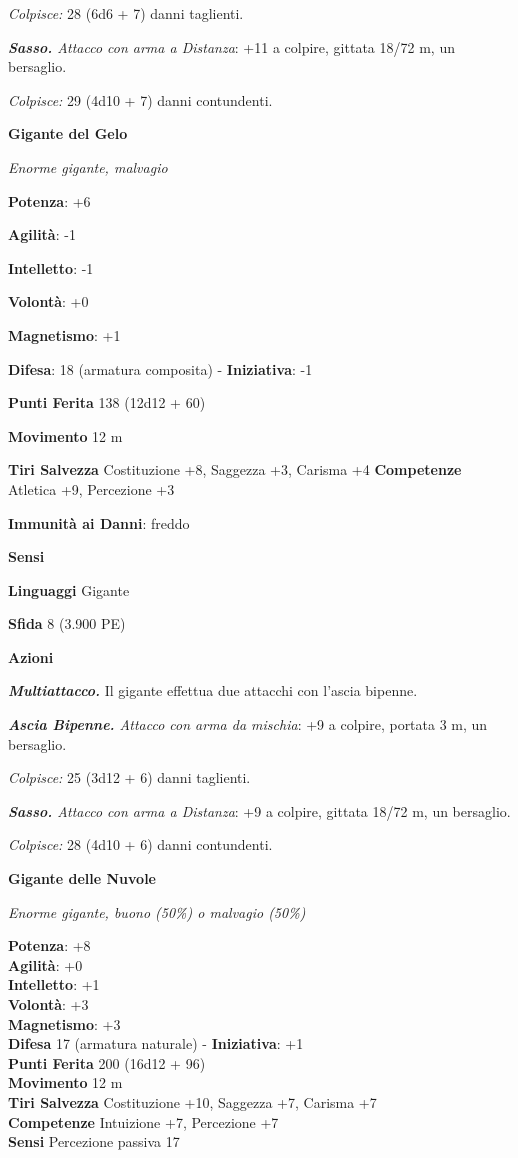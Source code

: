 \begin{multicols}{2}
\emph{Colpisce:} 28 (6d6 + 7) danni taglienti.

\emph{\textbf{Sasso.} Attacco con arma a Distanza}: +11 a colpire,
gittata 18/72 m, un bersaglio.

\emph{Colpisce:} 29 (4d10 + 7) danni contundenti.

\textbf{Gigante del Gelo}

\emph{Enorme gigante, malvagio}

\textbf{Potenza}: +6

\textbf{Agilità}: -1

\textbf{Intelletto}: -1

\textbf{Volontà}: +0

\textbf{Magnetismo}: +1

\textbf{Difesa}: 18 (armatura composita) - \textbf{Iniziativa}: -1

\textbf{Punti Ferita} 138 (12d12 + 60)

\textbf{Movimento} 12 m

\textbf{Tiri Salvezza} Costituzione +8, Saggezza +3, Carisma +4
\textbf{Competenze} Atletica +9, Percezione +3

\textbf{Immunità ai Danni}: freddo

\textbf{Sensi} 

\textbf{Linguaggi} Gigante

\textbf{Sfida} 8 (3.900 PE)\smallskip

\smallskip\textbf{Azioni}

\emph{\textbf{Multiattacco.}} Il gigante effettua due attacchi con
l'ascia bipenne.

\emph{\textbf{Ascia Bipenne.} Attacco con arma da mischia}: +9 a
colpire, portata 3 m, un bersaglio.

\emph{Colpisce:} 25 (3d12 + 6) danni taglienti.

\emph{\textbf{Sasso.} Attacco con arma a Distanza}: +9 a colpire,
gittata 18/72 m, un bersaglio.

\emph{Colpisce:} 28 (4d10 + 6) danni contundenti.

\medskip\textbf{Gigante delle Nuvole}

\emph{Enorme gigante, buono (50\%) o malvagio (50\%)}

\textbf{Potenza}: +8 \\
\textbf{Agilità}: +0\\
\textbf{Intelletto}: +1\\
\textbf{Volontà}: +3\\
\textbf{Magnetismo}: +3\\
\textbf{Difesa} 17 (armatura naturale) - \textbf{Iniziativa}: +1\\
\textbf{Punti Ferita} 200 (16d12 + 96)\\
\textbf{Movimento} 12 m\\
\textbf{Tiri Salvezza} Costituzione +10, Saggezza +7, Carisma +7\\
\textbf{Competenze} Intuizione +7, Percezione +7\\
\textbf{Sensi} Percezione passiva 17\\


\end{multicols}
